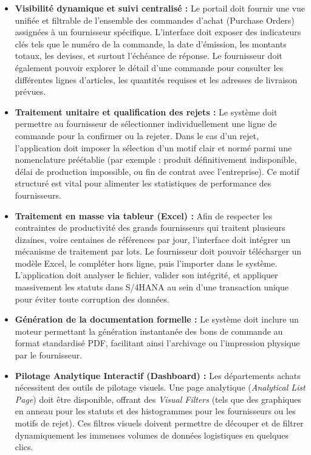 \documentclass[12pt,a4paper,oneside]{report}
\begin{document}
\begin{itemize}[label=-]
    \item \textbf{Visibilité dynamique et suivi centralisé :} Le portail doit fournir une vue unifiée et filtrable de l'ensemble des commandes d'achat (Purchase Orders) assignées à un fournisseur spécifique. L'interface doit exposer des indicateurs clés tels que le numéro de la commande, la date d'émission, les montants totaux, les devises, et surtout l'échéance de réponse. Le fournisseur doit également pouvoir explorer le détail d'une commande pour consulter les différentes lignes d'articles, les quantités requises et les adresses de livraison prévues.
    \item \textbf{Traitement unitaire et qualification des rejets :} Le système doit permettre au fournisseur de sélectionner individuellement une ligne de commande pour la confirmer ou la rejeter. Dans le cas d'un rejet, l'application doit imposer la sélection d'un motif clair et normé parmi une nomenclature préétablie (par exemple : produit définitivement indisponible, délai de production impossible, ou fin de contrat avec l'entreprise). Ce motif structuré est vital pour alimenter les statistiques de performance des fournisseurs.
    \item \textbf{Traitement en masse via tableur (Excel) :} Afin de respecter les contraintes de productivité des grands fournisseurs qui traitent plusieurs dizaines, voire centaines de références par jour, l'interface doit intégrer un mécanisme de traitement par lots. Le fournisseur doit pouvoir télécharger un modèle Excel, le compléter hors ligne, puis l'importer dans le système. L'application doit analyser le fichier, valider son intégrité, et appliquer massivement les statuts dans S/4HANA au sein d'une transaction unique pour éviter toute corruption des données.
    \item \textbf{Génération de la documentation formelle :} Le système doit inclure un moteur permettant la génération instantanée des bons de commande au format standardisé PDF, facilitant ainsi l'archivage ou l'impression physique par le fournisseur.
    \item \textbf{Pilotage Analytique Interactif (Dashboard) :} Les départements achats nécessitent des outils de pilotage visuels. Une page analytique (\textit{Analytical List Page}) doit être disponible, offrant des \textit{Visual Filters} (tels que des graphiques en anneau pour les statuts et des histogrammes pour les fournisseurs ou les motifs de rejet). Ces filtres visuels doivent permettre de découper et de filtrer dynamiquement les immenses volumes de données logistiques en quelques clics.
\end{itemize}
\end{document}
